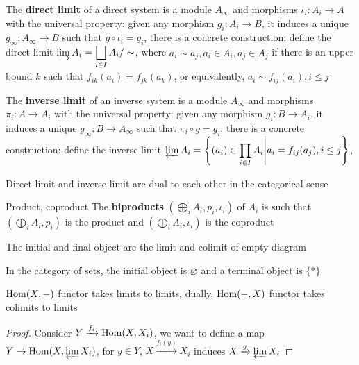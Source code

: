 \documentclass[main]{subfiles}
\begin{document}
\begin{definition}
The \textbf{direct limit} of a direct system is a module $A_\infty$ and morphisms $\iota_i:A_i\to A$ with the universal property: given any morphism $g_i:A_i\to B$, it induces a unique $g_\infty:A_\infty\to B$ such that $g\circ\iota_i=g_i$, there is a concrete construction: define the direct limit $\varinjlim A_i=\displaystyle\bigsqcup_{i\in I}A_i/\sim$, where $a_i\sim a_j, a_i\in A_i,a_j\in A_j$ if there is an upper bound $k$ such that $f_{ik}(a_i)=f_{jk}(a_k)$, or equivalently, $a_i\sim f_{ij}(a_i),i\leq j$
\end{definition}

\begin{definition}
The \textbf{inverse limit} of an inverse system is a module $A_\infty$ and morphisms $\pi_i:A\to A_i$ with the universal property: given any morphism $g_i:B\to A_i$, it induces a unique $g_\infty:B\to A_\infty$ such that $\pi_i\circ g=g_i$, there is a concrete construction: define the inverse limit $\varprojlim A_i=\displaystyle\left\{(a_i)\in\prod_{i\in I}A_i\middle|a_i=f_{ij}(a_j),i\leq j\right\}$, 
\end{definition}

\begin{remark}
Direct limit and inverse limit are dual to each other in the categorical sense
\end{remark}

\begin{definition}
Product, coproduct
The \textbf{biproducts} $(\bigoplus_iA_i,p_i,\iota_i)$ of $A_i$ is such that $(\bigoplus_iA_i,p_i)$ is the product and $(\bigoplus_iA_i,\iota_i)$ is the coproduct
\end{definition}

\begin{remark}
The initial and final object are the limit and colimit of empty diagram \par
In the category of sets, the initial object is $\varnothing$ and a terminal object is $\{*\}$
\end{remark}

\begin{lemma}
$\operatorname{Hom}(X,-)$ functor takes limits to limits, dually, $\operatorname{Hom}(-,X)$ functor takes colimits to limits
\end{lemma}

\begin{proof}
Consider $Y\xrightarrow{f_i}\operatorname{Hom}(X,X_i)$, we want to define a map $Y\to\operatorname{Hom}(X,\varprojlim X_i)$, for $y\in Y$, $X\xrightarrow{f_i(y)} X_i$ induces $X\xrightarrow g\varprojlim X_i$
\end{proof}
\end{document}
